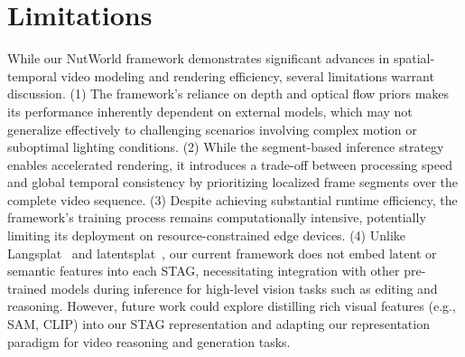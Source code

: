 \section{Limitations}
\label{app:limit}
While our NutWorld framework demonstrates significant advances in spatial-temporal video modeling and rendering efficiency, several limitations warrant discussion. (1) The framework's reliance on depth and optical flow priors makes its performance inherently dependent on external models, which may not generalize effectively to challenging scenarios involving complex motion or suboptimal lighting conditions. (2) While the segment-based inference strategy enables accelerated rendering, it introduces a trade-off between processing speed and global temporal consistency by prioritizing localized frame segments over the complete video sequence. (3) Despite achieving substantial runtime efficiency, the framework's training process remains computationally intensive, potentially limiting its deployment on resource-constrained edge devices. (4) Unlike Langsplat~\cite{qin2024langsplat} and latentsplat~\cite{wewer2024latentsplat}, our current framework does not embed latent or semantic features into each STAG, necessitating integration with other pre-trained models during inference for high-level vision tasks such as editing and reasoning. However, future work could explore distilling rich visual features (e.g., SAM, CLIP) into our STAG representation and adapting our representation paradigm for video reasoning and generation tasks.

\clearpage 
\newpage

















